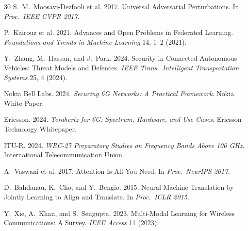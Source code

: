 \documentclass[sigconf,nonacm]{acmart}
\begin{document}
\begin{thebibliography}{30}
S.~M.~Moosavi-Dezfooli et al. 2017. Universal Adversarial
Perturbations. In \textit{Proc.\ IEEE CVPR 2017}.

P.~Kairouz et al. 2021. Advances and Open Problems in Federated
Learning. \textit{Foundations and Trends in Machine Learning} 14,
1--2 (2021).

Y.~Zhang, M.~Hassan, and J.~Park. 2024. Security in Connected
Autonomous Vehicles: Threat Models and Defences.
\textit{IEEE Trans.\ Intelligent Transportation Systems}
25, 4 (2024).

Nokia Bell Labs. 2024. \textit{Securing 6G Networks: A Practical
Framework}. Nokia White Paper.

Ericsson. 2024. \textit{Terahertz for 6G: Spectrum, Hardware,
and Use Cases}. Ericsson Technology Whitepaper.

ITU-R. 2024. \textit{WRC-27 Preparatory Studies on Frequency
Bands Above 100 GHz}. International Telecommunication Union.

A.~Vaswani et al. 2017. Attention Is All You Need. In
\textit{Proc.\ NeurIPS 2017}.

D.~Bahdanau, K.~Cho, and Y.~Bengio. 2015. Neural Machine
Translation by Jointly Learning to Align and Translate. In
\textit{Proc.\ ICLR 2015}.

Y.~Xie, A.~Khan, and S.~Sengupta. 2023. Multi-Modal Learning
for Wireless Communications: A Survey. \textit{IEEE Access} 11
(2023).

\end{thebibliography}
\end{document}
